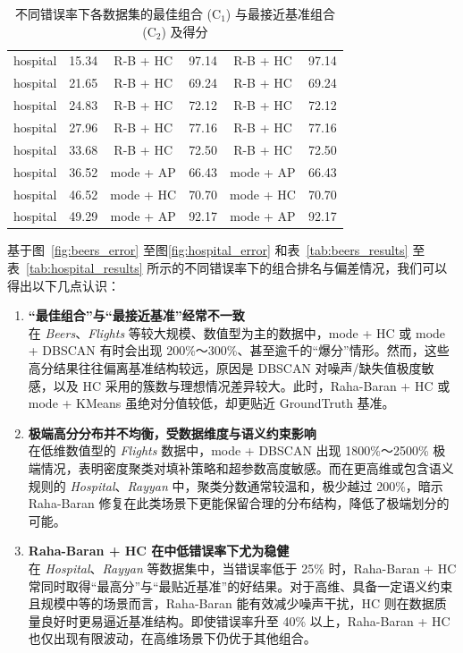 \documentclass[10pt]{article} %
\numberwithin{equation}{section}
\begin{document}
\begin{table}[htbp]
\begin{subtable}{0.48\linewidth}
{\begin{tabular}{lccccc}
                hospital & 15.34 & R-B + HC  & 97.14  & R-B + HC  & 97.14  \\
                hospital & 21.65 & R-B + HC  & 69.24  & R-B + HC  & 69.24  \\
                hospital & 24.83 & R-B + HC  & 72.12  & R-B + HC  & 72.12  \\
                hospital & 27.96 & R-B + HC  & 77.16  & R-B + HC  & 77.16  \\
                hospital & 33.68 & R-B + HC  & 72.50  & R-B + HC  & 72.50  \\
                hospital & 36.52 & mode + AP & 66.43  & mode + AP & 66.43  \\
                hospital & 46.52 & mode + HC & 70.70  & mode + HC & 70.70  \\
                hospital & 49.29 & mode + AP & 92.17  & mode + AP & 92.17  \\
                \bottomrule
            \end{tabular}
        }
    \end{subtable}

    \caption{不同错误率下各数据集的最佳组合 (C$_1$) 与最接近基准组合 (C$_2$) 及得分}
    \label{tab:all_results}
\end{table}

\vspace{0.5em}
\noindent
基于图~\ref{fig:beers_error} 至图\ref{fig:hospital_error} 和表~\ref{tab:beers_results} 至表~\ref{tab:hospital_results} 所示的不同错误率下的组合排名与偏差情况，我们可以得出以下几点认识：

\begin{enumerate}
    \item \textbf{“最佳组合”与“最接近基准”经常不一致}\\
    在 \textit{Beers}、\textit{Flights} 等较大规模、数值型为主的数据中，mode + HC 或 mode + DBSCAN 有时会出现 200\%～300\%、甚至逾千的“爆分”情形。然而，这些高分结果往往偏离基准结构较远，原因是 DBSCAN 对噪声/缺失值极度敏感，以及 HC 采用的簇数与理想情况差异较大。此时，Raha-Baran + HC 或 mode + KMeans 虽绝对分值较低，却更贴近 GroundTruth 基准。

    \item \textbf{极端高分分布并不均衡，受数据维度与语义约束影响}\\
    在低维数值型的 \textit{Flights} 数据中，mode + DBSCAN 出现 1800\%～2500\% 极端情况，表明密度聚类对填补策略和超参数高度敏感。而在更高维或包含语义规则的 \textit{Hospital}、\textit{Rayyan} 中，聚类分数通常较温和，极少越过 200\%，暗示 Raha-Baran 修复在此类场景下更能保留合理的分布结构，降低了极端划分的可能。

    \item \textbf{Raha-Baran + HC 在中低错误率下尤为稳健}\\
    在 \textit{Hospital}、\textit{Rayyan} 等数据集中，当错误率低于 25\% 时，Raha-Baran + HC 常同时取得“最高分”与“最贴近基准”的好结果。对于高维、具备一定语义约束且规模中等的场景而言，Raha-Baran 能有效减少噪声干扰，HC 则在数据质量良好时更易逼近基准结构。即使错误率升至 40\% 以上，Raha-Baran + HC 也仅出现有限波动，在高维场景下仍优于其他组合。
\end{enumerate}
\end{document}
